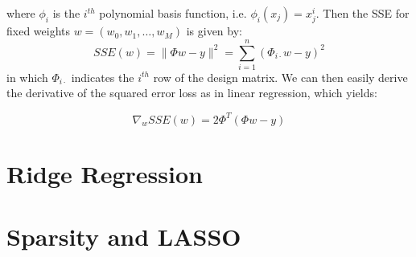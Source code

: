 \documentclass[psamsfonts]{amsart}
\theoremstyle{definition}
\theoremstyle{remark}
\numberwithin{equation}{section}
\begin{document}
where $\phi_i$ is the $i^{th}$ polynomial basis function, i.e. $\phi_i(x_j) = x_j^i$. Then the SSE for fixed weights $w = (w_0, w_1, \dots, w_M)$ is given by:
$$SSE(w) = \|\Phi w - y\|^2 = \sum_{i=1}^n (\Phi_{i\cdot}w - y)^2$$
in which $\Phi_{i\cdot}$ indicates the $i^{th}$ row of the design matrix. We can then easily derive the derivative of the squared error loss as in linear regression, which yields:

$$\nabla_w SSE(w) = 2 \Phi^T(\Phi w - y)$$

\section{Ridge Regression}

\section{Sparsity and LASSO}
\end{document}
